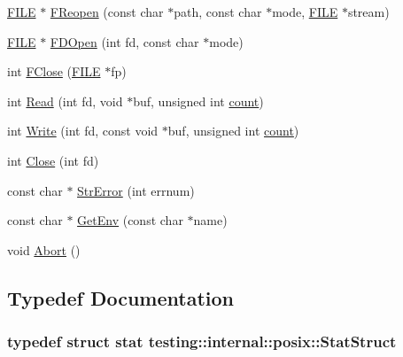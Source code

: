 \begin{DoxyCompactItemize}
\hyperlink{gmock__output__test__golden_8txt_ab12dc6c67167ae2f0af132bdd8c2955e}{F\+I\+LE} $\ast$ \hyperlink{namespacetesting_1_1internal_1_1posix_a9ef6d089cdae03f9d9e0e6d379c40703}{F\+Reopen} (const char $\ast$path, const char $\ast$mode, \hyperlink{gmock__output__test__golden_8txt_ab12dc6c67167ae2f0af132bdd8c2955e}{F\+I\+LE} $\ast$stream)
\item 
\hyperlink{gmock__output__test__golden_8txt_ab12dc6c67167ae2f0af132bdd8c2955e}{F\+I\+LE} $\ast$ \hyperlink{namespacetesting_1_1internal_1_1posix_af7c268eba32d5a718b36b6b3801302e0}{F\+D\+Open} (int fd, const char $\ast$mode)
\item 
int \hyperlink{namespacetesting_1_1internal_1_1posix_af4beeaaa8d62916d5e3b644a1ddfbd6b}{F\+Close} (\hyperlink{gmock__output__test__golden_8txt_ab12dc6c67167ae2f0af132bdd8c2955e}{F\+I\+LE} $\ast$fp)
\item 
int \hyperlink{namespacetesting_1_1internal_1_1posix_a3c6ab13e581a56f1b02f3eb7536c97fd}{Read} (int fd, void $\ast$buf, unsigned int \hyperlink{gmock__stress__test_8cc_afd9db40e3361ae09188795e8cbe19752}{count})
\item 
int \hyperlink{namespacetesting_1_1internal_1_1posix_af4acf9f78d55f815a18b43786511abef}{Write} (int fd, const void $\ast$buf, unsigned int \hyperlink{gmock__stress__test_8cc_afd9db40e3361ae09188795e8cbe19752}{count})
\item 
int \hyperlink{namespacetesting_1_1internal_1_1posix_a15e5b8f2a535ef1b2529b85b861e4846}{Close} (int fd)
\item 
const char $\ast$ \hyperlink{namespacetesting_1_1internal_1_1posix_a4b77b14af6f4d18f83d303b98e9349c4}{Str\+Error} (int errnum)
\item 
const char $\ast$ \hyperlink{namespacetesting_1_1internal_1_1posix_a1d5e3da5a27eed25986859fa83cafe95}{Get\+Env} (const char $\ast$name)
\item 
void \hyperlink{namespacetesting_1_1internal_1_1posix_a69b8278c59359dd6a6f941b4643db9fb}{Abort} ()
\end{DoxyCompactItemize}


\subsection{Typedef Documentation}
\subsubsection[{\texorpdfstring{Stat\+Struct}{StatStruct}}]{\setlength{\rightskip}{0pt plus 5cm}typedef struct stat {\bf testing\+::internal\+::posix\+::\+Stat\+Struct}}\hypertarget{namespacetesting_1_1internal_1_1posix_a8eb9f08d3af29941c2d2a964cfff3ecb}{}\label{namespacetesting_1_1internal_1_1posix_a8eb9f08d3af29941c2d2a964cfff3ecb}


